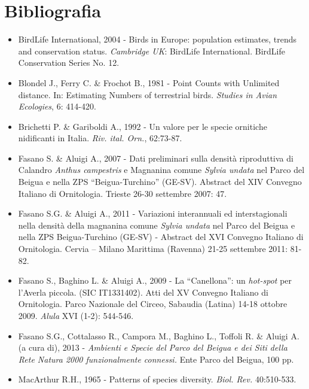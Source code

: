 \section*{Bibliografia}
\begin{itemize}\itemsep0pt
	\item BirdLife International, 2004 - Birds in Europe: population
estimates, trends and conservation status. \textit{Cambridge UK}:
BirdLife International. BirdLife Conservation Series No. 12. 

	\item Blondel J., Ferry C. \& Frochot B., 1981 - Point Counts with Unlimited
distance. In: Estimating Numbers of terrestrial birds. \textit{Studies
in Avian Ecologies}, 6: 414-420. 

	\item Brichetti P. \& Gariboldi A., 1992 - Un
{\guillemotleft}valore{\guillemotright} per le specie ornitiche
nidificanti in Italia. \textit{Riv. ital. Orn.}, 62:73-87. 

	\item Fasano S. \& Aluigi A., 2007 - Dati preliminari sulla densit\`a
riproduttiva di Calandro \textit{Anthus campestris }e Magnanina comune
\textit{Sylvia undata} nel Parco del Beigua e nella ZPS
{\textquotedblleft}Beigua-Turchino{\textquotedblright} (GE-SV).
Abstract del XIV Convegno Italiano di Ornitologia. Trieste 26-30
settembre 2007: 47. 

	\item Fasano S.G. \& Aluigi A., 2011 - Variazioni interannuali ed
interstagionali nella densit\`a della magnanina comune \textit{Sylvia
undata} nel Parco del Beigua e nella ZPS Beigua-Turchino
(GE-SV) - Abstract del XVI Convegno Italiano di Ornitologia. Cervia -- Milano Marittima (Ravenna) 21-25 settembre 2011: 81-82. 

	\item Fasano S., Baghino L. \& Aluigi A., 2009 - La
{\textquotedblleft}Canellona{\textquotedblright}: un \textit{hot-spot}
per l{\textquoteright}Averla piccola. (SIC IT1331402). Atti del XV
Convegno Italiano di Ornitologia. Parco Nazionale del Circeo, Sabaudia
(Latina) 14-18 ottobre 2009. \textit{Alula} XVI (1-2): 544-546.

	\item Fasano S.G., Cottalasso R., Campora M., Baghino L., Toffoli R. \& Aluigi
A. (a cura di), 2013 - \textit{Ambienti e Specie del Parco del Beigua e
dei Siti della Rete Natura 2000 funzionalmente connessi.} Ente Parco
del Beigua, 100 pp. 

	\item MacArthur R.H., 1965 - Patterns of species diversity. \textit{Biol. Rev.} 40:510-533. 
\end{itemize}
